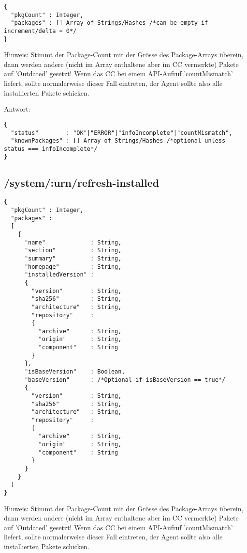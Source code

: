 \begin{verbatim}
{
  "pkgCount" : Integer,
  "packages" : [] Array of Strings/Hashes /*can be empty if increment/delta = 0*/
}
\end{verbatim}

Hinweis: Stimmt der Package-Count mit der Grösse des Package-Arrays überein, dann werden andere (nicht im Array enthaltene aber im CC vermerkte) Pakete auf 'Outdated' gesetzt! Wenn das CC bei einem API-Aufruf 'countMismatch' liefert, sollte normalerweise dieser Fall eintreten, der Agent sollte also alle installierten Pakete schicken.


Antwort:

\begin{verbatim}
{
  "status"        : "OK"|"ERROR"|"infoIncomplete"|"countMismatch",
  "knownPackages" : [] Array of Strings/Hashes /*optional unless status === infoIncomplete*/
}
\end{verbatim}


\subsection*{/system/:urn/refresh-installed}

\begin{verbatim}
{
  "pkgCount" : Integer,
  "packages" :
  [
    {
      "name"             : String,
      "section"          : String,
      "summary"          : String,
      "homepage"         : String,
      "installedVersion" :
      {
        "version"        : String,
        "sha256"         : String,
        "architecture"   : String,
        "repository"     :
        {
          "archive"      : String,
          "origin"       : String,
          "component"    : String
        }
      },
      "isBaseVersion"    : Boolean,
      "baseVersion"      : /*Optional if isBaseVersion == true*/
      {
        "version"        : String,
        "sha256"         : String,
        "architecture"   : String,
        "repository"     :
        {
          "archive"      : String,
          "origin"       : String,
          "component"    : String
        }
      }
    }
  ]
}
\end{verbatim}

Hinweis: Stimmt der Package-Count mit der Grösse des Package-Arrays überein, dann werden andere (nicht im Array enthaltene aber im CC vermerkte) Pakete auf 'Outdated' gesetzt! Wenn das CC bei einem API-Aufruf 'countMismatch' liefert, sollte normalerweise dieser Fall eintreten, der Agent sollte also alle installierten Pakete schicken.


